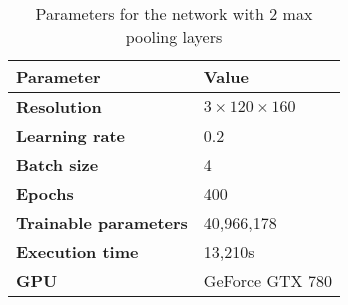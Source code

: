\begin{table}[h!]
	\footnotesize
	\centering
	\begin{tabular}{ll}
	\hline
		\textbf{Parameter} & \textbf{Value}\\
	\hline
	\hline
		\textbf{Resolution} & $3 \times 120\times160$\\
		\textbf{Learning rate} & 0.2\\
		\textbf{Batch size} & 4\\
		\textbf{Epochs} & 400\\
		\textbf{Trainable parameters} & 40,966,178\\
		\textbf{Execution time} & 13,210s\\
		\textbf{GPU} & GeForce GTX 780\\
	\hline
	\end{tabular}
	\caption{Parameters for the network with 2 max pooling layers}
	\label{tab:params_2maxpooling_network}
\end{table}
